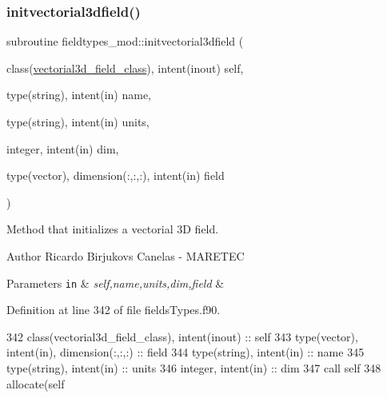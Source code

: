 \subsubsection{\texorpdfstring{initvectorial3dfield()}{initvectorial3dfield()}}
{\footnotesize\ttfamily subroutine fieldtypes\+\_\+mod\+::initvectorial3dfield (\begin{DoxyParamCaption}\item[{class(\mbox{\hyperlink{structfieldtypes__mod_1_1vectorial3d__field__class}{vectorial3d\+\_\+field\+\_\+class}}), intent(inout)}]{self,  }\item[{type(string), intent(in)}]{name,  }\item[{type(string), intent(in)}]{units,  }\item[{integer, intent(in)}]{dim,  }\item[{type(vector), dimension(\+:,\+:,\+:), intent(in)}]{field }\end{DoxyParamCaption})\hspace{0.3cm}{\ttfamily [private]}}



Method that initializes a vectorial 3D field. 

\begin{DoxyAuthor}{Author}
Ricardo Birjukovs Canelas -\/ M\+A\+R\+E\+T\+EC 
\end{DoxyAuthor}

\begin{DoxyParams}[1]{Parameters}
\mbox{\tt in}  & {\em self,name,units,dim,field} & \\
\hline
\end{DoxyParams}


Definition at line 342 of file fields\+Types.\+f90.


\begin{DoxyCode}
342     \textcolor{keywordtype}{class}(vectorial3d\_field\_class), \textcolor{keywordtype}{intent(inout)} :: self
343     \textcolor{keywordtype}{type}(vector), \textcolor{keywordtype}{intent(in)}, \textcolor{keywordtype}{dimension(:,:,:)} :: field
344     \textcolor{keywordtype}{type}(string), \textcolor{keywordtype}{intent(in)} :: name
345     \textcolor{keywordtype}{type}(string), \textcolor{keywordtype}{intent(in)} :: units
346     \textcolor{keywordtype}{integer}, \textcolor{keywordtype}{intent(in)} :: dim
347     \textcolor{keyword}{call }self%
348     \textcolor{keyword}{allocate}(self%
\end{DoxyCode}
\mbox{\label{namespacefieldtypes__mod_ad458710e4a2d6c40a3dfa7f19481cd5a}} 
